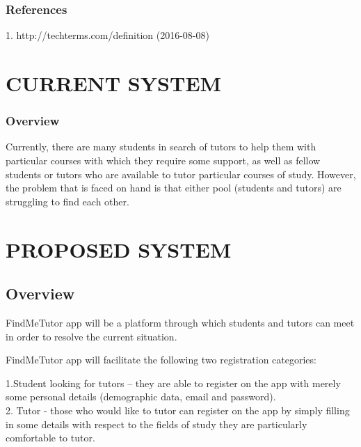 \documentclass[12pt]{article}
\begin{document}
\subsubsection{References}
1. http://techterms.com/definition (2016-08-08)

\section{CURRENT SYSTEM}
\subsubsection{Overview}
\begin{flushleft}
Currently, there are many students in search of tutors to help them with particular courses with which they require some support, as well as fellow students or tutors who are available to tutor particular courses of study. However, the problem that is faced on hand is that either pool (students and tutors) are struggling to find each other. 
\end{flushleft}

\section{PROPOSED SYSTEM}
\subsection{Overview}
\begin{flushleft}
FindMeTutor app will be a platform through which students and tutors can meet in order to resolve the current situation. 
\end{flushleft}
\begin{flushleft}
FindMeTutor app will facilitate the following two registration categories: 

\begin{flushleft}
1.Student looking for tutors – they are able to register on the app with merely some personal details (demographic data, email and password).\\
2. Tutor - those who would like to tutor can register on the app by simply filling in some details with respect to the fields of study they are particularly comfortable to tutor.\\
\end{flushleft}
\end{flushleft}
\end{document}

